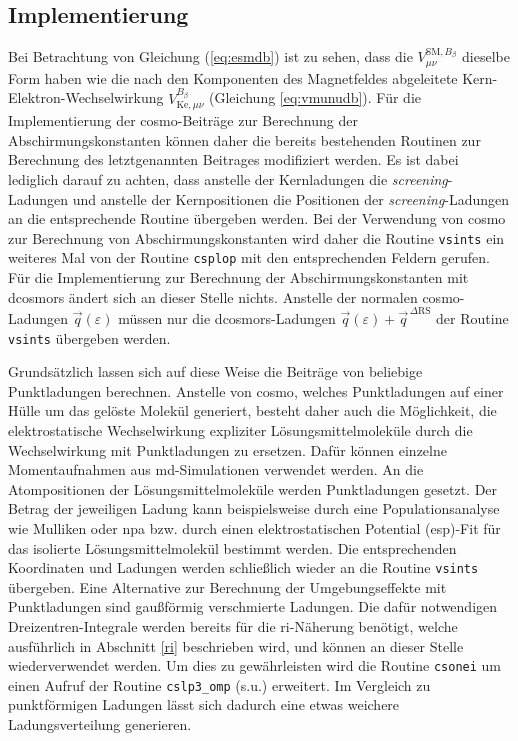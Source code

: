 	\subsection{Implementierung}\label{kap:cosmoimp}
	Bei Betrachtung von Gleichung (\ref{eq:esmdb}) ist zu sehen, dass die $V_{\mu\nu}^{\textrm{SM},B_\beta}$ dieselbe Form haben wie die nach den Komponenten des Magnetfeldes abgeleitete Kern-Elektron-Wechselwirkung $V_{\textrm{Ke},\mu\nu}^{B_\beta}$ (Gleichung \ref{eq:vmunudb}). Für die Implementierung der \ac{cosmo}-Beiträge zur Berechnung der Abschirmungskonstanten können daher die bereits bestehenden Routinen zur Berechnung des letztgenannten Beitrages modifiziert werden. Es ist dabei lediglich darauf zu achten, dass anstelle der Kernladungen die \textit{screening}-Ladungen und anstelle der Kernpositionen die Positionen der \textit{screening}-Ladungen an die entsprechende Routine übergeben werden. Bei der Verwendung von \ac{cosmo} zur Berechnung von Abschirmungskonstanten wird daher die Routine \texttt{vsints} ein weiteres Mal von der Routine \texttt{csplop} mit den entsprechenden Feldern gerufen. Für die Implementierung zur Berechnung der Abschirmungskonstanten mit \ac{dcosmors} ändert sich an dieser Stelle nichts. Anstelle der normalen \ac{cosmo}-Ladungen $\vec{q}(\varepsilon)$ müssen nur die \ac{dcosmors}-Ladungen $\vec{q}(\varepsilon)+\vec{q}^{\,\Delta\textrm{RS}}$ der Routine \texttt{vsints} übergeben werden.
	
Grundsätzlich lassen sich auf diese Weise die Beiträge von beliebige Punktladungen berechnen. Anstelle von \ac{cosmo}, welches Punktladungen auf einer Hülle um das gelöste Molekül generiert, besteht daher auch die Möglichkeit, die elektrostatische Wechselwirkung expliziter Lösungsmittelmoleküle durch die Wechselwirkung mit Punktladungen zu ersetzen. Dafür können einzelne Momentaufnahmen aus \ac{md}-Simulationen verwendet werden. An die Atompositionen der Lösungsmittelmoleküle werden Punktladungen gesetzt. Der Betrag der jeweiligen Ladung kann beispielsweise durch eine Populationsanalyse wie Mulliken\supercite{mulliken1955electronic} oder \ac{npa}\supercite{reed1985natural} bzw. durch einen elektrostatischen Potential (\acs{esp})-Fit\supercite{singh1984approach} für das isolierte Lösungsmittelmolekül bestimmt werden. Die entsprechenden Koordinaten und Ladungen werden schließlich wieder an die Routine \texttt{vsints} übergeben. Eine Alternative zur Berechnung der Umgebungseffekte mit Punktladungen sind gaußförmig verschmierte Ladungen. Die dafür notwendigen Dreizentren-Integrale werden bereits für die \ac{ri}-Näherung benötigt, welche ausführlich in Abschnitt \ref{ri} beschrieben wird, und können an dieser Stelle wiederverwendet werden. Um dies zu gewährleisten wird die Routine \texttt{csonei} um einen Aufruf der Routine \texttt{cslp3\_omp} (s.u.) erweitert. Im Vergleich zu punktförmigen Ladungen lässt sich dadurch eine etwas weichere Ladungsverteilung generieren. 

